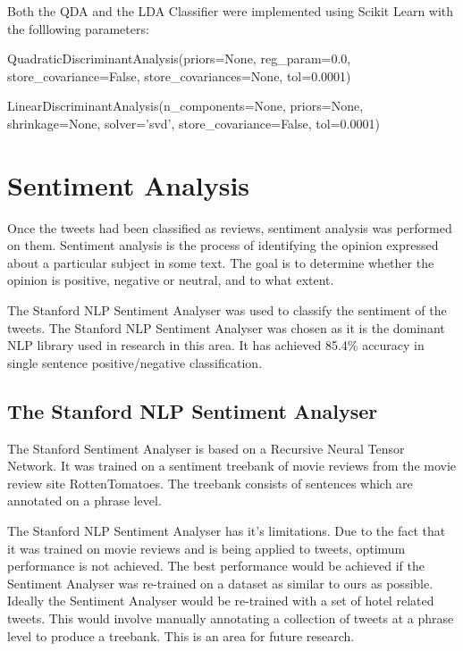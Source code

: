 Both the QDA and the LDA Classifier were implemented using Scikit Learn with the folllowing parameters:

\begin{tcolorbox}
\begin{center}
	QuadraticDiscriminantAnalysis(priors=None, reg\_param=0.0, store\_covariance=False, store\_covariances=None, tol=0.0001)
\end{center}
\end{tcolorbox}

\begin{tcolorbox}
\begin{center}
	LinearDiscriminantAnalysis(n\_components=None, priors=None, shrinkage=None, solver='svd', store\_covariance=False, tol=0.0001)
\end{center}
\end{tcolorbox}


\section{Sentiment Analysis}

Once the tweets had been classified as reviews, sentiment analysis was performed on them. Sentiment analysis is the process of identifying the opinion expressed about a particular subject in some text. The goal is to determine whether the opinion is positive, negative or neutral, and to what extent. 

The Stanford NLP Sentiment Analyser \cite{stanfordSentiment2013} was used to classify the sentiment of the tweets. The Stanford NLP Sentiment Analyser was chosen as it is the dominant NLP library used in research in this area. It has achieved 85.4\% accuracy in single sentence positive/negative classification. 

\subsection{The Stanford NLP Sentiment Analyser}

The Stanford Sentiment Analyser is based on a Recursive Neural Tensor Network. It was trained on a sentiment treebank of movie reviews from the movie review site RottenTomatoes. The treebank consists of sentences which are annotated on a phrase level. 

The Stanford NLP Sentiment Analyser has it's limitations. Due to the fact that it was trained on movie reviews and is being applied to tweets, optimum performance is not achieved. The best performance would be achieved if the Sentiment Analyser was re-trained on a dataset as similar to ours as possible. Ideally the Sentiment Analyser would be re-trained with a set of hotel related tweets. This would involve manually annotating a collection of tweets at a phrase level to produce a treebank. This is an area for future research.

